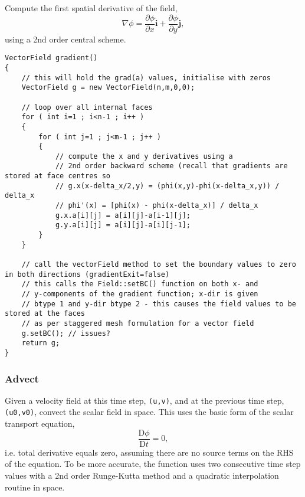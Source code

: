 \documentclass[notitlepage]{article}
\begin{document}
Compute the first spatial derivative of the field,
%
\begin{equation}
\nabla \phi = \frac{\partial\phi}{\partial x} \hat{\mathbf{i}}
	+ \frac{\partial\phi}{\partial y} \hat{\mathbf{j}},
\end{equation}
%
using a 2nd order central scheme.

\begin{lstlisting}[style=myCpp]
VectorField gradient()
{
	// this will hold the grad(a) values, initialise with zeros
	VectorField g = new VectorField(n,m,0,0);
	
	// loop over all internal faces
	for ( int i=1 ; i<n-1 ; i++ )
	{
		for ( int j=1 ; j<m-1 ; j++ )
		{
			// compute the x and y derivatives using a
			// 2nd order backward scheme (recall that gradients are stored at face centres so
			// g.x(x-delta_x/2,y) = (phi(x,y)-phi(x-delta_x,y)) / delta_x
			// phi'(x) = [phi(x) - phi(x-delta_x)] / delta_x
			g.x.a[i][j] = a[i][j]-a[i-1][j];
			g.y.a[i][j] = a[i][j]-a[i][j-1];
		}
	}
	
	// call the vectorField method to set the boundary values to zero in both directions (gradientExit=false)
	// this calls the Field::setBC() function on both x- and
	// y-components of the gradient function; x-dir is given
	// btype 1 and y-dir btype 2 - this causes the field values to be stored at the faces
	// as per staggered mesh formulation for a vector field
	g.setBC(); // issues?
	return g;
}
\end{lstlisting}

\subsubsection{Advect}

Given a velocity field at this time step, \texttt{(u,v)}, and at the previous time step,
\texttt{(u0,v0)}, convect the scalar field in space. This uses the basic form of the scalar
transport equation,
%
\begin{equation}
\frac{\mathrm{D} \phi}{\mathrm{D}t} = 0,
\end{equation}
%
i.e. total derivative equals zero, assuming there are no
source terms on the RHS of the equation. To be more accurate, the function uses
two consecutive time step values with a 2nd order Runge-Kutta method and a
quadratic interpolation routine in space.
\end{document}
